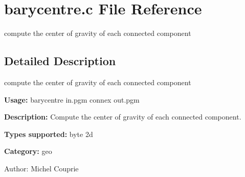 \section{barycentre.c File Reference}
\label{barycentre_8c}
compute the center of gravity of each connected component  




\label{_details}
\subsection{Detailed Description}
compute the center of gravity of each connected component 

{\bf Usage:} barycentre in.pgm connex out.pgm

{\bf Description:} Compute the center of gravity of each connected component.

{\bf Types supported:} byte 2d

{\bf Category:} geo

\begin{Desc}
\item[Author:]Michel Couprie \end{Desc}
